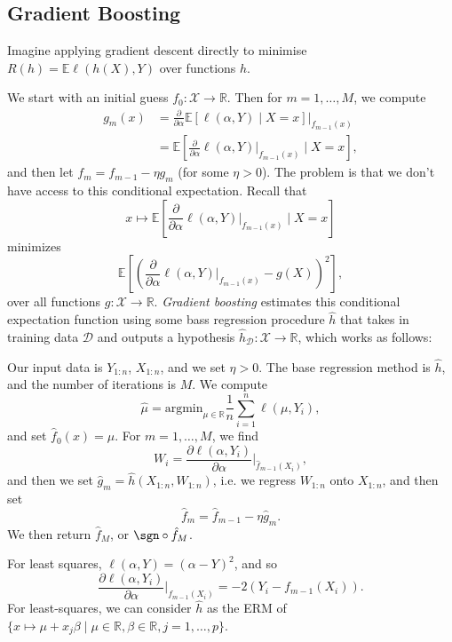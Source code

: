 \documentclass[12pt]{article}
\begin{document}
\subsection{Gradient Boosting}
\label{sub:gb}

Imagine applying gradient descent directly to minimise $R(h) = \mathbb{E} \ell(h(X), Y)$ over functions $h$.

We start with an initial guess $f_0 : \mathcal{X} \to \mathbb{R}$. Then for $m = 1, \ldots, M$, we compute
\begin{align*}
	g_m(x) &= \frac{\partial}{\partial \alpha} \mathbb{E}[ \ell(\alpha, Y) \mid X = x] \biggr|_{f_{m-1}(x)} \\
	       &= \mathbb{E}\left[ \frac{\partial}{\partial \alpha} \ell(\alpha, Y)\biggr|_{f_{m-1}(x)} \mid X = x \right],
\end{align*}
and then let $f_m = f_{m-1} - \eta g_m$ (for some $\eta > 0$). The problem is that we don't have access to this conditional expectation. Recall that
\[
x \mapsto \mathbb{E}\left[ \frac{\partial}{\partial \alpha} \ell(\alpha, Y) \biggr|_{f_{m-1}(x)} \mid X = x\right]
\]
minimizes
\[
\mathbb{E}\left[ \left( \frac{\partial}{\partial \alpha} \ell(\alpha, Y) \biggr|_{f_{m-1}(x)} - g(X) \right)^2 \right],
\]
over all functions $g : \mathcal{X} \to \mathbb{R}$. \emph{Gradient boosting} estimates this conditional expectation function using some bass regression procedure $\hat h$ that takes in training data $\mathcal{D}$ and outputs a hypothesis $\hat h_{\mathcal{D}} : \mathcal{X} \to \mathbb{R}$, which works as follows:

Our input data is $Y_{1:n}$, $X_{1:n}$, and we set $\eta > 0$. The base regression method is $\hat h$, and the number of iterations is $M$. We compute
\[
\hat \mu = \mathrm{argmin}_{\mu \in \mathbb{R}} \frac{1}{n} \sum_{i = 1}^n \ell(\mu, Y_i),
\]
and set $\hat f_0(x) = \hat \mu$. For $m = 1, \ldots, M$, we find
\[
W_i = \frac{\partial \ell(\alpha, Y_i)}{\partial \alpha} \biggr|_{\hat f_{m-1}(X_i)},
\]
and then we set $\hat g_m = \hat h(X_{1:n}, W_{1:n})$, i.e. we regress $W_{1:n}$ onto $X_{1:n}$, and then set
\[
\hat f_m = \hat f_{m-1} - \eta \hat g_m.
\]
We then return $\hat f_M$, or $\sgn \circ \hat f_M$.

\begin{exbox}
	For least squares, $\ell(\alpha, Y) = (\alpha - Y)^2$, and so
	\[
	\frac{\partial \ell(\alpha, Y_i)}{\partial \alpha} \biggr|_{f_{m-1}(X_i)} = -2(Y_i - f_{m-1}(X_i)).
	\]
	For least-squares, we can consider $\hat h$ as the ERM of $\{x \mapsto \mu + x_j \beta \mid \mu \in \mathbb{R}, \beta \in \mathbb{R}, j = 1, \ldots, p\}$.
\end{exbox}
\end{document}
